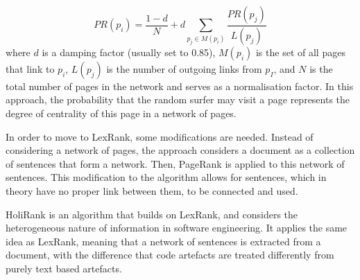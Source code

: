 \begin{equation}
PR(p_i) = \frac{1-d}{N}+ d\sum\limits_{p_j\in M(p_i)}\frac{PR(p_j)}{L(p_j)}
\end{equation}
where $d$ is a damping factor (usually set to 0.85), $M(p_i)$ is the set of all pages that link to $p_i$, $L(p_j)$ is the number of outgoing links from $p_I$, and $N$ is the total number of pages in the network and serves as a normalisation factor. In this approach, the probability that the random surfer may visit a page represents the degree of centrality of this page in a network of pages.

In order to move to LexRank\cite{Erkan:2004:LGL:1622487.1622501}, some modifications are needed. Instead of considering a network of pages, the approach considers a document as a collection of sentences that form a network. Then, PageRank\cite{ilprints422} is applied to this network of sentences. This modification to the algorithm allows for sentences, which in theory have no proper link between them, to be connected and used. 

HoliRank\cite{Ponz2017a} is an algorithm that builds on LexRank\cite{Erkan:2004:LGL:1622487.1622501}, and considers the heterogeneous nature of information in software engineering. It applies the same idea as LexRank\cite{Erkan:2004:LGL:1622487.1622501}, meaning that a network of sentences is extracted from a document, with the difference that code artefacts are treated differently from purely text based artefacts.